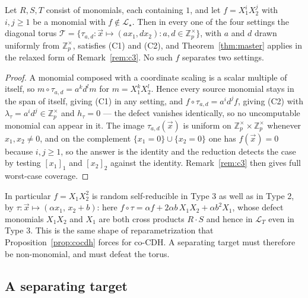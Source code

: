 \documentclass{conjura-solution}
\newcommand{\Zpx}{\mathbb{Z}_p^{\times}}
\newcommand{\vx}{\vec{x}}
\newcommand{\LL}{\mathcal{L}}
\begin{document}
\begin{proposition}
\label{prop:nomono}
Let $R,S,T$ consist of monomials, each containing $1$, and let $f=X_1^{i}X_2^{j}$ with
$i,j\ge 1$ be a monomial with $f\notin\LL_\star$. Then in every one of the four settings the
diagonal torus $\mathcal T=\{\tau_{a,d}\colon\vx\mapsto(ax_1,dx_2):a,d\in\Zpx\}$, with $a$ and
$d$ drawn uniformly from $\Zpx$, satisfies
\textup{(C1)} and \textup{(C2)}, and Theorem~\ref{thm:master} applies in the relaxed form of
Remark~\ref{rem:c3}. No such $f$ separates two settings.
\end{proposition}
\begin{proof}
A monomial composed with a coordinate scaling is a scalar multiple of itself, so
$m\circ\tau_{a,d}=a^{k}d^{l}m$ for $m=X_1^{k}X_2^{l}$. Hence every source monomial stays in
the span of itself, giving (C1) in any setting, and $f\circ\tau_{a,d}=a^{i}d^{j}f$, giving
(C2) with $\lambda_\tau=a^{i}d^{j}\in\Zpx$ and $h_\tau=0$ --- the defect vanishes identically,
so no uncomputable monomial can appear in it. The image $\tau_{a,d}(\vx)$ is uniform on
$\Zpx\times\Zpx$ whenever $x_1,x_2\neq 0$, and on the complement
$\{x_1=0\}\cup\{x_2=0\}$ one has $f(\vx)=0$ because $i,j\ge 1$, so the answer is the identity
and the reduction detects the case by testing $[x_1]_1$ and $[x_2]_2$ against the identity.
Remark~\ref{rem:c3} then gives full worst-case coverage.
\end{proof}

In particular $f=X_1X_2^{2}$ is random self-reducible in Type 3 as well as in Type 2, by
$\tau\colon\vx\mapsto(\alpha x_1,\,x_2+b)$: here $f\circ\tau=\alpha f+2\alpha b\,X_1X_2+
\alpha b^{2}X_1$, whose defect monomials $X_1X_2$ and $X_1$ are both cross products $R\cdot S$
and hence in $\LL_T$ even in Type 3. This is the same shape of reparametrization that
Proposition~\ref{prop:cocdh} forces for co-CDH\@. A separating target must therefore be
non-monomial, and must defeat the torus.

\subsection{A separating target}
\end{document}
